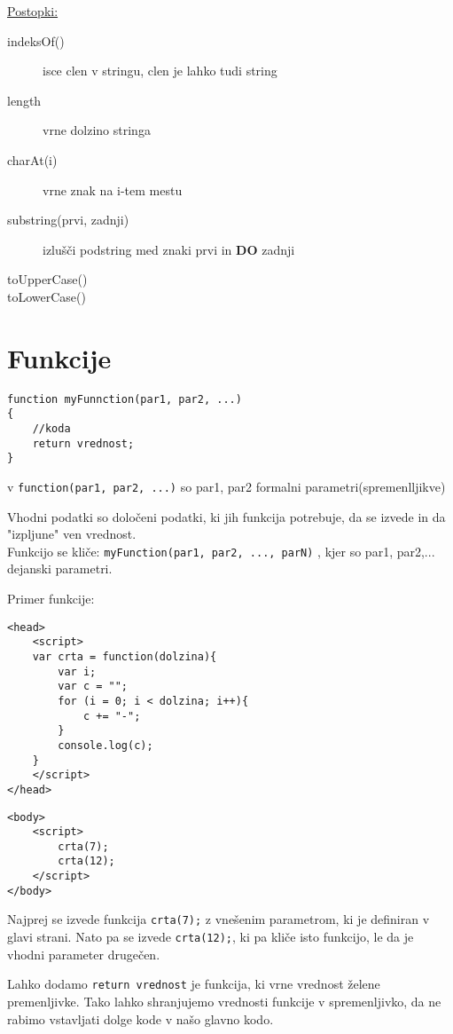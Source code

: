 \underline{Postopki:}

\begin{description}
	\item[indeksOf()] isce clen v stringu, clen je lahko tudi string
	\item[length] vrne dolzino stringa
	\item[charAt(i)] vrne znak na i-tem mestu
	\item[substring(prvi, zadnji)] izlušči podstring med znaki prvi in  \textbf{DO} zadnji
	\item[toUpperCase()]
	\item[toLowerCase()]
\end{description}

\section{Funkcije}

\begin{verbatim}
function myFunnction(par1, par2, ...)
{
    //koda
    return vrednost;
}

\end{verbatim}

v \texttt{function(par1, par2, ...)} so par1, par2 formalni parametri(spremenlljikve)
 
Vhodni podatki so določeni podatki, ki jih funkcija potrebuje, da se izvede in da "izpljune" ven vrednost.\\

Funkcijo se kliče: \texttt{myFunction(par1, par2, ..., parN)} , kjer so par1, par2,... dejanski parametri.

\newpage
Primer funkcije:

\begin{verbatim}
<head>
    <script>
    var crta = function(dolzina){
        var i;
        var c = "";
        for (i = 0; i < dolzina; i++){
            c += "-";
        }
        console.log(c);
    }
    </script>
</head>
\end{verbatim}
\begin{verbatim}
<body>
    <script>
        crta(7);
        crta(12);
    </script>
</body>
\end{verbatim}

Najprej se izvede funkcija \texttt{crta(7);} z vnešenim parametrom, ki je definiran v glavi strani. Nato pa se izvede \texttt{crta(12);}, ki pa kliče isto funkcijo, le da je vhodni parameter drugečen.

Lahko dodamo  \texttt{return vrednost} je funkcija, ki vrne vrednost želene premenljivke.
Tako lahko shranjujemo vrednosti funkcije v spremenljivko, da ne rabimo vstavljati dolge kode v našo glavno kodo.

